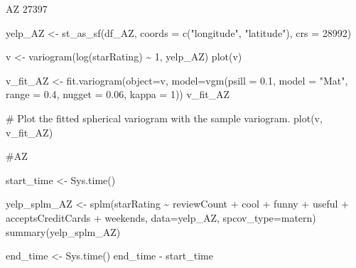 \documentclass[
  12pt,
  letterpaper,
  DIV=11,
  numbers=noendperiod]{scrartcl}
\newenvironment{Shaded}{\begin{snugshade}}{\end{snugshade}}
\newcommand{\AttributeTok}[1]{\textcolor[rgb]{0.98,0.46,0.51}{#1}}
\newcommand{\CommentTok}[1]{\textcolor[rgb]{0.42,0.45,0.49}{#1}}
\newcommand{\DecValTok}[1]{\textcolor[rgb]{0.47,0.72,1.00}{#1}}
\newcommand{\FloatTok}[1]{\textcolor[rgb]{0.47,0.72,1.00}{#1}}
\newcommand{\FunctionTok}[1]{\textcolor[rgb]{0.70,0.57,0.94}{#1}}
\newcommand{\NormalTok}[1]{\textcolor[rgb]{0.88,0.89,0.91}{#1}}
\newcommand{\OtherTok}[1]{\textcolor[rgb]{0.70,0.57,0.94}{#1}}
\newcommand{\SpecialCharTok}[1]{\textcolor[rgb]{0.47,0.72,1.00}{#1}}
\newcommand{\StringTok}[1]{\textcolor[rgb]{0.62,0.80,1.00}{#1}}
\begin{document}
AZ 27397

\begin{Shaded}
\begin{Highlighting}[]
\NormalTok{yelp\_AZ }\OtherTok{\textless{}{-}} \FunctionTok{st\_as\_sf}\NormalTok{(df\_AZ, }\AttributeTok{coords =} \FunctionTok{c}\NormalTok{(}\StringTok{"longitude"}\NormalTok{, }\StringTok{"latitude"}\NormalTok{), }\AttributeTok{crs =} \DecValTok{28992}\NormalTok{)}
\end{Highlighting}
\end{Shaded}

\begin{Shaded}
\begin{Highlighting}[]
\NormalTok{v }\OtherTok{\textless{}{-}} \FunctionTok{variogram}\NormalTok{(}\FunctionTok{log}\NormalTok{(starRating) }\SpecialCharTok{\textasciitilde{}} \DecValTok{1}\NormalTok{, yelp\_AZ)}
\FunctionTok{plot}\NormalTok{(v)}
\end{Highlighting}
\end{Shaded}

\begin{Shaded}
\begin{Highlighting}[]
\NormalTok{v\_fit\_AZ }\OtherTok{\textless{}{-}} \FunctionTok{fit.variogram}\NormalTok{(}\AttributeTok{object=}\NormalTok{v, }
                           \AttributeTok{model=}\FunctionTok{vgm}\NormalTok{(}\AttributeTok{psill =} \FloatTok{0.1}\NormalTok{, }\AttributeTok{model =} \StringTok{"Mat"}\NormalTok{, }
                                     \AttributeTok{range =} \FloatTok{0.4}\NormalTok{, }\AttributeTok{nugget =} \FloatTok{0.06}\NormalTok{, }\AttributeTok{kappa =} \DecValTok{1}\NormalTok{))}
\NormalTok{v\_fit\_AZ}

\CommentTok{\# Plot the fitted spherical variogram with the sample variogram.}
\FunctionTok{plot}\NormalTok{(v, v\_fit\_AZ)}
\end{Highlighting}
\end{Shaded}

\begin{Shaded}
\begin{Highlighting}[]
\CommentTok{\#AZ}

\NormalTok{start\_time }\OtherTok{\textless{}{-}} \FunctionTok{Sys.time}\NormalTok{()}

\NormalTok{yelp\_splm\_AZ }\OtherTok{\textless{}{-}} \FunctionTok{splm}\NormalTok{(starRating }\SpecialCharTok{\textasciitilde{}}\NormalTok{ reviewCount }\SpecialCharTok{+}\NormalTok{ cool }\SpecialCharTok{+}\NormalTok{ funny }\SpecialCharTok{+}\NormalTok{ useful }\SpecialCharTok{+}\NormalTok{ acceptsCreditCards }\SpecialCharTok{+}\NormalTok{ weekends, }\AttributeTok{data=}\NormalTok{yelp\_AZ, }\AttributeTok{spcov\_type=}\StringTok{\textquotesingle{}matern\textquotesingle{}}\NormalTok{)}
\FunctionTok{summary}\NormalTok{(yelp\_splm\_AZ)}

\NormalTok{end\_time }\OtherTok{\textless{}{-}} \FunctionTok{Sys.time}\NormalTok{()}
\NormalTok{end\_time }\SpecialCharTok{{-}}\NormalTok{ start\_time}
\end{Highlighting}
\end{Shaded}
\end{document}
